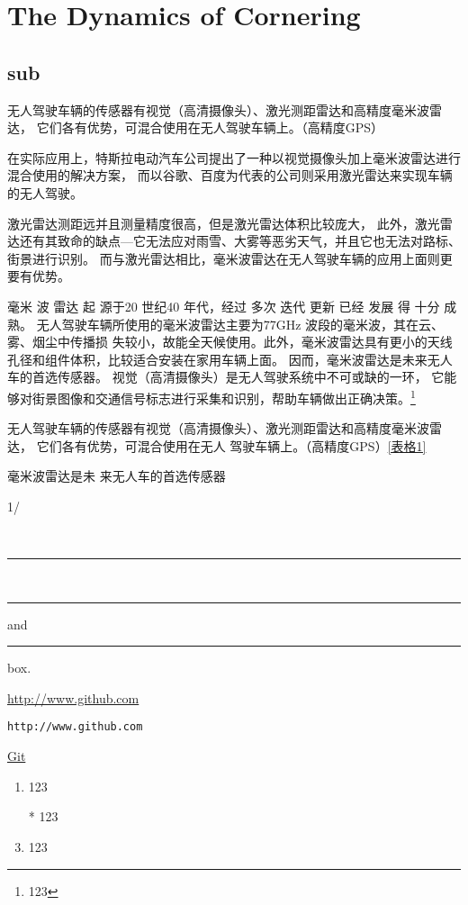 
\section[Cornering]{The Dynamics of Cornering}
		\subsection{sub}
无人驾驶车辆的传感器有视觉（高清摄像头）、激光测距雷达和高精度毫米波雷达，
它们各有优势，可混合使用在无人驾驶车辆上。（高精度GPS）\par
在实际应用上，特斯拉电动汽车公司提出了一种以视觉摄像头加上毫米波雷达进行混合使用的解决方案，
而以谷歌、百度为代表的公司则采用激光雷达来实现车辆的无人驾驶。\par
激光雷达测距远并且测量精度很高，但是激光雷达体积比较庞大，
此外，激光雷达还有其致命的缺点—它无法应对雨雪、大雾等恶劣天气，并且它也无法对路标、街景进行识别。
而与激光雷达相比，毫米波雷达在无人驾驶车辆的应用上面则更要有优势。 \par
毫米 波 雷达 起 源于20 世纪40 年代，经过 多次 迭代 更新 已经 发展 得 十分 成熟。
无人驾驶车辆所使用的毫米波雷达主要为77GHz 波段的毫米波，其在云、雾、烟尘中传播损
失较小，故能全天候使用。此外，毫米波雷达具有更小的天线孔径和组件体积，比较适合安装在家用车辆上面。
因而，毫米波雷达是未来无人车的首选传感器。
视觉（高清摄像头）是无人驾驶系统中不可或缺的一环，
它能够对街景图像和交通信号标志进行采集和识别，帮助车辆做出正确决策。\footnote{123}\par
{\CTEXnoindent 无人驾驶车辆的传感器有视觉（高清摄像头）、激光测距雷达和高精度毫米波雷达，
它们各有优势，可混合使用在无人  驾驶车辆上。（高精度GPS）\ref{表格1}\par}
{毫米波雷达是未 来无人车的首选传感器}

1/\textperthousand{}

\\
\rule{4pt}{4pt}\\
\rule[4pt]{6pt}{8pt} and
\rule[-4pt]{6pt}{8pt} box.



\url{http://www.github.com}\par
\nolinkurl{http://www.github.com} \par
\href{http://www.baidu.com}{Git}

		\begin{enumerate}
			\item 123
			\item[*] 123
			\item 123
		\end{enumerate}
	
